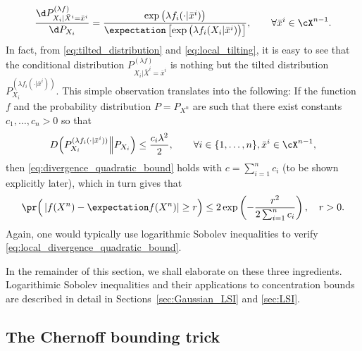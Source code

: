 \documentclass{article}
\theoremstyle{plain}
\begin{document}
\begin{enumerate}
\begin{align}\label{eq:local_tilting}
	\frac{\d P^{(\lambda f)}_{X_i|\bar{X}^i = \bar{x}^i}}{\d P_{X_i}} = \frac{\exp\big(\lambda f_i(\cdot|\bar{x}^i)\big)}{\expectation \left[\exp\big(\lambda f_i(X_i|\bar{x}^i)\big)\right]}, \qquad \forall \bar{x}^i \in \cX^{n-1}.
\end{align}
In fact, from \eqref{eq:tilted_distribution} and \eqref{eq:local_tilting}, it is easy to see that the conditional distribution $P^{(\lambda f)}_{X_i|\bar{X}^i = \bar{x}^i}$ is nothing but the tilted distribution $P^{(\lambda f_i(\cdot|\bar{x}^i))}_{X_i}$. This simple observation translates into the following: If the function $f$ and the probability distribution $P = P_{X^n}$ are such that there exist constants $c_1,\ldots,c_n > 0$ so that
\begin{align}\label{eq:local_divergence_quadratic_bound}
	D\Big(P^{(\lambda f_i(\cdot|\bar{x}^i))}_{X_i} \Big\| P_{X_i} \Big) \le \frac{c_i \lambda^2}{2}, \qquad \forall i \in \{1,\ldots,n\}, \bar{x}^i \in \cX^{n-1},
\end{align}
then \eqref{eq:divergence_quadratic_bound} holds with $c = \sum^n_{i=1}c_i$ (to be shown explicitly later),
which in turn gives that
\begin{align}
	\pr \Big( \left|f(X^n) - \expectation f(X^n) \right| \ge r \Big) \le 2 \exp\left( - \frac{r^2}{2 \sum^n_{i=1}c_i} \right), \quad r > 0.
\end{align}
Again, one would typically use logarithmic Sobolev inequalities to verify \eqref{eq:local_divergence_quadratic_bound}.
\end{enumerate}
In the remainder of this section, we shall elaborate on these three ingredients. Logarithimic Sobolev inequalities and their applications to concentration bounds are described in detail in Sections~\ref{sec:Gaussian_LSI} and \ref{sec:LSI}.

\subsection{The Chernoff bounding trick}
\end{document}
